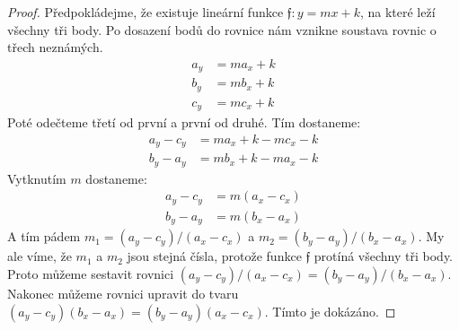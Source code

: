 \begin{proof}
    Předpokládejme, že existuje lineární funkce $\mathfrak{f}: y = mx+k$, na které leží všechny tři body. Po dosazení bodů do rovnice nám vznikne soustava rovnic o třech neznámých. 
    \begin{align*}
        a_y &= ma_x+k \\
        b_y &= mb_x+k \\
        c_y &= mc_x+k 
    \end{align*}
    Poté odečteme třetí od první a první od druhé. Tím dostaneme:
    \begin{align*}
        a_y-c_y &= ma_x+k - mc_x -k \\
        b_y-a_y &= mb_x+k -ma_x -k 
    \end{align*}
    Vytknutím $m$ dostaneme:
    \begin{align*}
        a_y-c_y &= m(a_x-c_x) \\
        b_y-a_y &= m(b_x-a_x) 
    \end{align*}
    A tím pádem $m_1 = (a_y-c_y)/(a_x-c_x)$ a $ m_2=(b_y-a_y)/(b_x-a_x)$. My ale víme, že $m_1$ a $m_2$ jsou stejná čísla, protože funkce $\mathfrak{f}$ protíná všechny tři body. Proto můžeme sestavit rovnici $(a_y-c_y)/(a_x-c_x) = (b_y-a_y)/(b_x-a_x)$. Nakonec můžeme rovnici upravit do tvaru $(a_y-c_y)(b_x-a_x) = (b_y-a_y)(a_x-c_x)$. Tímto je  dokázáno.
\end{proof}